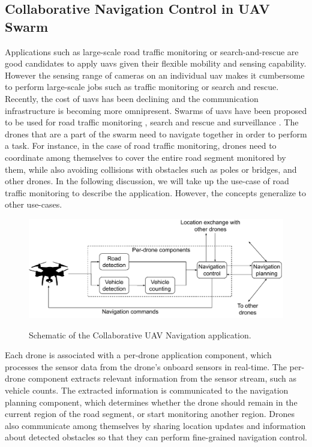 \subsection{Collaborative Navigation Control in UAV Swarm}
Applications such as large-scale road traffic monitoring or search-and-rescue are good candidates to apply \glspl{uav} given their flexible mobility and sensing capability. However the sensing range of cameras on an individual \gls{uav} makes it cumbersome to perform large-scale jobs such as traffic monitoring or search and rescue. Recently, the cost of \glspl{uav} has been declining and the communication infrastructure is becoming more omnipresent. Swarms of \glspl{uav} have been proposed to be used for road traffic monitoring \cite{huang2021decentralized}, search and rescue \cite{scherer2015autonomous} and surveillance \cite{meng2015skystitch}. The drones that are a part of the swarm need to navigate together in order to perform a task. For instance, in the case of road traffic monitoring, drones need to coordinate among themselves to cover the entire road segment monitored by them, while also avoiding collisions with obstacles such as poles or bridges, and other drones. In the following discussion, we will take up the use-case of road traffic monitoring to describe the application. However, the concepts generalize to other use-cases.

\begin{figure}[h]
\centering
\includegraphics[width=0.75\columnwidth]{figures/apps/collab_drone_navigation}
\label{fig:collab_drone_navig}
\caption{Schematic of the Collaborative UAV Navigation application.}
\end{figure}

\par Each drone is associated with a per-drone application component, which processes the sensor data from the drone's onboard sensors in real-time. The per-drone component extracts relevant information from the sensor stream, such as vehicle counts. The extracted information is communicated to the navigation planning component, which determines whether the drone should remain in the current region of the road segment, or start monitoring another region. Drones also communicate among themselves by sharing location updates and information about detected obstacles so that they can perform fine-grained navigation control.

